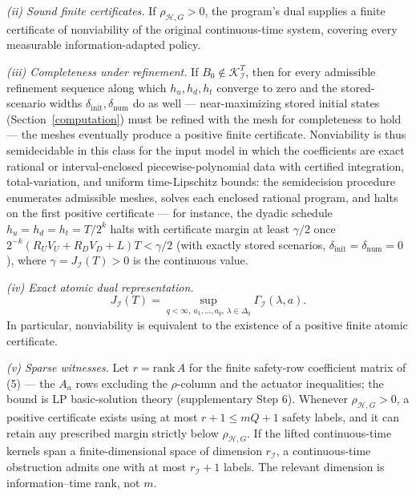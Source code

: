 \documentclass[10pt,twocolumn]{article}
\theoremstyle{plain}
\theoremstyle{definition}
\theoremstyle{remark}
\begin{document}
\noindent\emph{(ii) Sound finite certificates.} If \(\rho_{\mathcal{H},G} > 0\), the
program's dual supplies a finite certificate of nonviability of the original
continuous-time system, covering every measurable information-adapted policy.

\noindent\emph{(iii) Completeness under refinement.} If
\(B_0 \notin \mathcal{K}_{\mathcal{I}}^T\), then for every admissible
refinement sequence along which \(h_u, h_d, h_t\) converge to zero and the
stored-scenario widths \(\delta_{\mathrm{init}}, \delta_{\mathrm{num}}\)
do as well --- near-maximizing stored initial states
(Section~\ref{computation}) must be refined with the mesh for completeness
to hold --- the meshes eventually produce a positive
finite certificate. Nonviability is thus semidecidable in this class for
the input model in which the coefficients are exact rational or
interval-enclosed piecewise-polynomial data with certified integration,
total-variation, and uniform time-Lipschitz bounds: the semidecision
procedure enumerates admissible meshes, solves each enclosed rational
program, and halts on the first positive certificate --- for instance, the
dyadic schedule \(h_u = h_d = h_t = T/2^k\) halts with certificate margin
at least \(\gamma/2\) once \(2^{-k}(R_U V_U + R_D V_D + L)T < \gamma/2\)
(with exactly stored scenarios, \(\delta_{\mathrm{init}} =
\delta_{\mathrm{num}} = 0\)),
where \(\gamma = J_{\mathcal{I}}(T) > 0\) is the continuous value.

\noindent\emph{(iv) Exact atomic dual representation.}
\[
J_{\mathcal{I}}(T) = \sup_{q < \infty,\ a_1,\dots,a_q,\
\lambda \in \Delta_q} \Gamma_{\mathcal{I}}(\lambda, a).
\tag{9}
\]
In particular, nonviability is equivalent to the existence of a positive
finite atomic certificate.

\noindent\emph{(v) Sparse witnesses.} Let \(r = \mathrm{rank}\, A\) for the
finite safety-row coefficient matrix of (5) --- the \(A_a\) rows excluding
the \(\rho\)-column and the actuator inequalities; the bound is LP
basic-solution theory (supplementary Step 6). Whenever \(\rho_{\mathcal{H},G} > 0\), a
positive certificate exists using at most \(r + 1 \le mQ + 1\) safety labels,
and it can retain any prescribed margin strictly below
\(\rho_{\mathcal{H},G}\). If the lifted continuous-time kernels span a
finite-dimensional space of dimension \(r_{\mathcal{I}}\), a continuous-time
obstruction admits one with at most \(r_{\mathcal{I}} + 1\) labels. The relevant
dimension is information--time rank, not \(m\).
\end{document}
